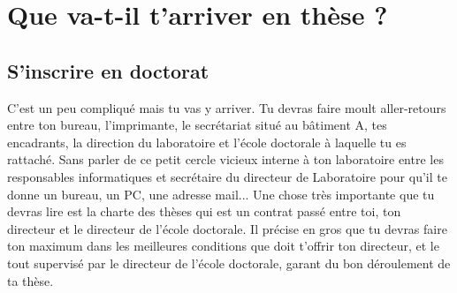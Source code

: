 \chapter{Que va-t-il t'arriver en thèse ?}\trad

\section{S'inscrire en doctorat}\trad
C'est un peu compliqué mais tu vas y arriver.
Tu devras faire moult aller-retours entre ton bureau, l'imprimante, le secrétariat situé au bâtiment A, tes encadrants, la direction du laboratoire et l'école doctorale à laquelle tu es rattaché.
Sans parler de ce petit cercle vicieux interne à ton laboratoire entre les responsables informatiques et secrétaire du directeur de Laboratoire pour qu'il te donne un bureau, un PC, une adresse mail...
Une chose très importante que tu devras lire est la charte des thèses qui est un contrat passé entre toi, ton directeur et le directeur de l'école doctorale.
Il précise en gros que tu devras faire ton maximum dans les meilleures conditions que doit t'offrir ton directeur, et le tout supervisé par le directeur de l'école doctorale, garant du bon déroulement de ta thèse.

